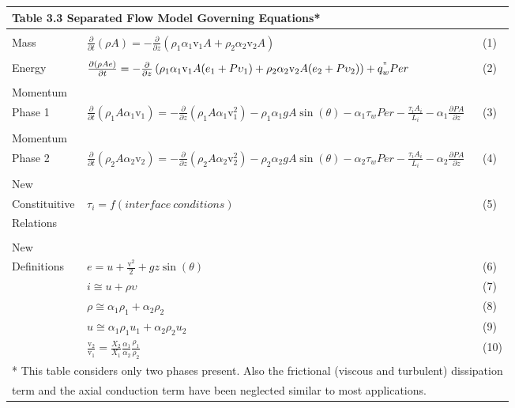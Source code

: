 \documentclass[12pt,fleqn]{report}
\begin{document}
{\newpage
\clearpage
\samepage \begin{tabular}{*{3}{l}}
\multicolumn{3}{l}{\bf Table 3.3  Separated Flow Model Governing Equations*} \\ [5mm] \hline
  &   &  \\ 
Mass & $\frac{\partial}{\partial t} \left( \rho A \right) = - \frac{\partial}{\partial z} \left( \rho_{1} \alpha_{1} \mbox{v}_{1} A  + \rho_{2} \alpha_{2} \mbox{v}_{2} A \right)$ & (1)\\ 
   &  &   \\ 
Energy & $\frac{\partial \left( \rho Ae \right)}{\partial t} = -\frac{\partial}{\partial z} \left( \rho_{1} \alpha_{1} \mbox{v}_{1} A(e_{1}+P\upsilon_{1}) + \rho_{2} \alpha_{2} \mbox{v}_{2} A(e_{2}+P\upsilon_{2}) \right) + q_{w}^{"}Per$ & (2)\\ 
    &   &  \\ 
Momentum &  & \\ 
Phase 1 & $\frac{\partial}{\partial t}\left( \rho_{1}A \alpha_{1} \mbox{v}_{1} \right) = - \frac{\partial}{\partial z} \left( \rho_{1} A \alpha_{1} \mbox{v}_{1}^{2} \right) - \rho_{1} \alpha_{1}g A \sin(\theta) - \alpha_{1}\tau_{w}Per -  \frac{\tau_{i}A_{i}}{L_{i}} - \alpha_{1}\frac{\partial PA}{\partial z}$ & (3)\\ 
 & & \\ 
Momentum &  & \\ 
Phase 2 & $\frac{\partial}{\partial t}\left( \rho_{2}A \alpha_{2} \mbox{v}_{2} \right) = - \frac{\partial}{\partial z} \left( \rho_{2} A \alpha_{2} \mbox{v}_{2}^{2} \right) - \rho_{2} \alpha_{2}g A \sin(\theta) - \alpha_{2}\tau_{w}Per -  \frac{\tau_{i}A_{i}}{L_{i}} - \alpha_{2}\frac{\partial PA}{\partial z}$ & (4)\\ 
 & & \\ 
New & & \\ 
Constituitive & $\tau_{i} = f(interface \: conditions)$& (5) \\ 
Relations  &  &  \\ 
  &  &  \\ 
New  &  &  \\ 
Definitions & $e =  u + \frac{\mbox{v}^{2}}{2} + gz\sin(\theta)$ & (6)\\ 
  & $i \cong u+\rho \upsilon$ & (7) \\ 
  & $\rho\cong \alpha_{1}\rho_{1} + \alpha_{2}\rho_{2}$ & (8)\\ 
  & $u\cong \alpha_{1}\rho_{1}u_{1} + \alpha_{2}\rho_{2}u_{2}$ & (9)\\ 
  & $\frac{\mbox{v}_{2}}{\mbox{v}_{1}} = \frac{X_{2}}{X_{1}} \frac{\alpha_{1}}{\alpha_{2}} \frac{\rho_{1}}{\rho_{2}}$ & (10) \\  [5mm] \hline
\multicolumn{3}{l}{* This table considers only two phases present.  Also the frictional (viscous and turbulent) dissipation}\\ 
\multicolumn{3}{l}{\hspace{2mm} term and the axial conduction term have been neglected similar to most applications.}
\end{tabular}
}
\end{document}
